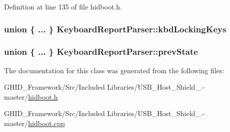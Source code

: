 \-Definition at line 135 of file hidboot.\-h.

\hypertarget{class_keyboard_report_parser_a8a8bd1a171e6b17d1c6db04cedeeff44}{
\subsubsection[{kbd\-Locking\-Keys}]{\setlength{\rightskip}{0pt plus 5cm}union \{ ... \}   {\bf \-Keyboard\-Report\-Parser\-::kbd\-Locking\-Keys}}}\label{class_keyboard_report_parser_a8a8bd1a171e6b17d1c6db04cedeeff44}
\hypertarget{class_keyboard_report_parser_af11da7bfeaff2505a36aa68abb0984f1}{
\subsubsection[{prev\-State}]{\setlength{\rightskip}{0pt plus 5cm}union \{ ... \}   {\bf \-Keyboard\-Report\-Parser\-::prev\-State}}}\label{class_keyboard_report_parser_af11da7bfeaff2505a36aa68abb0984f1}


\-The documentation for this class was generated from the following files\-:\begin{DoxyCompactItemize}
\item 
\-G\-H\-I\-D\-\_\-\-Framework/\-Src/\-Included Libraries/\-U\-S\-B\-\_\-\-Host\-\_\-\-Shield\-\_.-\/master/\hyperlink{hidboot_8h}{hidboot.\-h}\item 
\-G\-H\-I\-D\-\_\-\-Framework/\-Src/\-Included Libraries/\-U\-S\-B\-\_\-\-Host\-\_\-\-Shield\-\_.-\/master/\hyperlink{hidboot_8cpp}{hidboot.\-cpp}\end{DoxyCompactItemize}
